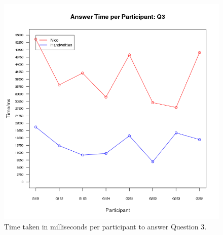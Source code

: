 \documentclass[12pt,twoside,notitlepage,xetex]{report}
\begin{document}
\begin{center}
\begin{figure}[H]
\begin{center}
\includegraphics[height=\textheight/2-2cm]{figs/graphs/q3.png}
\end{center}
\caption{Time taken in milliseconds per participant to answer Question 3.}
\end{figure}
\end{center}
\end{document}
